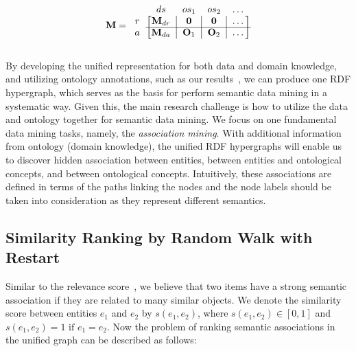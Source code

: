 \begin{equation}
\label{striped_M}
\mathbf{M}=\begin{blockarray}{ccccc}
                ~ & ds & os_1 & os_2 & \dots \\
            \begin{block}{c[c|c|c|c]}
                r   &   \mathbf{M}_{dr}  &   \mathbf{0}   &   \mathbf{0}   &   \dots \\
                \cline{2-5}
                a   &   \mathbf{M}_{da}  &   \mathbf{O}_1 &   \mathbf{O}_2 &   \dots \\
            \end{block}
        \end{blockarray}
\end{equation}

By developing the unified representation for both data and domain knowledge, and utilizing ontology annotations, such as our results~\cite{LePendu2010}, we can produce one RDF hypergraph, which serves as the basis for perform semantic data mining in a systematic way. Given this, the main research challenge is how to utilize the data and ontology together for semantic data mining. We focus on one fundamental data mining tasks, namely, the {\em association mining}. With additional information from ontology (domain knowledge), the unified RDF hypergraphs will enable us to discover hidden association between entities, between entities and ontological concepts, and between ontological concepts. Intuitively, these associations are defined in terms of the paths linking the nodes and the node labels should be taken into consideration as they represent different semantics.



\subsection{Similarity Ranking by Random Walk with Restart}

Similar to the relevance score~\cite{SunEtal05}, we believe that two items have a strong semantic association if they are related to many similar objects. We denote the similarity score between entities $e_1$ and $e_2$ by $s(e_1, e_2)$, where $s(e_1,e_2) \in [0, 1]$ and $s(e_1, e_2) = 1 \text{ if } e_1 = e_2$. Now the problem of ranking semantic associations in the unified graph can be described as follows:

